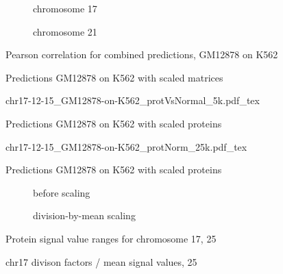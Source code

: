 \begin{appendices}
\begin{figure}[hb]
 \centering
 \begin{subfigure}{0.495\textwidth}
 \centering
 \caption{chromosome 17}
 \label{fig:app:Pearson:GM12878:K562:chr17:25kb:combi}
\end{subfigure} \hfill
\begin{subfigure}{0.495\textwidth}
 \centering
 \caption{chromosome 21}
 \label{fig:app:Pearson:GM12878:K562:chr21:25kb:combi}
 \end{subfigure}
 \caption{Pearson correlation for combined predictions, GM12878 on K562}
\end{figure}

\begin{figure}[hb]
 \centering
 \caption{Predictions GM12878 on K562 with scaled matrices}
 \label{fig:app:GM12878:K562:chr17:normalizedMatrices}
\end{figure}
\begin{figure}[hb]
 \centering
 \scriptsize
 {chr17-12-15_GM12878-on-K562_protVsNormal_5k.pdf_tex}
 \caption{Predictions GM12878 on K562 with scaled proteins}
 \label{fig:app:GM12878:K562:chr17:normalizedProteins}
\end{figure}

\begin{figure}[hb]
 \centering
 \scriptsize
 {chr17-12-15_GM12878-on-K562_protNorm_25k.pdf_tex}
 \caption{Predictions GM12878 on K562 with scaled proteins}
 \label{fig:app:GM12878:K562:chr17:normalizedProteins:25k}
\end{figure}

\begin{figure}[hb]
 \centering
 \begin{subfigure}{0.495\textwidth}
 \centering
 \caption{before scaling}
 \label{fig:app:prots:valueRangeBefore}
\end{subfigure} \hfill
\begin{subfigure}{0.495\textwidth}
 \centering
 \caption{division-by-mean scaling}
 \label{fig:app:prots:valueRangeDivByMean}
 \end{subfigure}
 \caption{Protein signal value ranges for chromosome 17, \SI{25}{\kilo\bp}}
\end{figure}
\begin{figure}
 \centering
 \caption{chr17 divison factors / mean signal values, \SI{25}{\kilo\bp}}
 \label{fig:app:prots:divByMeanFactors}
 \end{figure}


\end{appendices}
